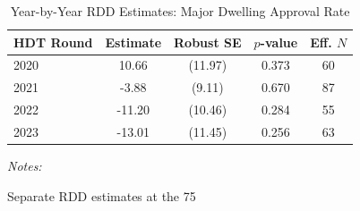 \begin{table}[!h]
\centering
\caption{\label{tab:tab:year_by_year}Year-by-Year RDD Estimates: Major Dwelling Approval Rate}
\centering
\begin{threeparttable}
\begin{tabular}[t]{lcccc}
\toprule
HDT Round & Estimate & Robust SE & $p$-value & Eff. $N$\\
\midrule
2020 & 10.66 & (11.97) & 0.373 & 60\\
2021 & -3.88 & (9.11) & 0.670 & 87\\
2022 & -11.20 & (10.46) & 0.284 & 55\\
2023 & -13.01 & (11.45) & 0.256 & 63\\
\bottomrule
\end{tabular}
\begin{tablenotes}
\item \textit{Notes:} 
\item Separate RDD estimates at the 75%
\end{tablenotes}
\end{threeparttable}
\end{table}

